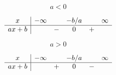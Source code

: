 \begin{minipage}{0.485\textwidth}
    \begin{center}
        \begin{equation*}
            a<0
        \end{equation*}
                  

               \begin{equation*}
                   \begin{array}[]{c|ccccc}
                        x&-\infty&&-b/a&&\infty\\
                         \hline
                         ax+b&&-&0&+&\\ 
                          \end{array}
                      \end{equation*}
    \end{center}
\end{minipage}
\hspace{1mm}
\begin{minipage}{0.485\textwidth}
    \begin{center}
        \begin{equation*}
            a>0
        \end{equation*}
                    

               \begin{equation*}
                   \begin{array}[]{c|ccccc}
                        x&-\infty&&-b/a&&\infty\\
                         \hline
                         ax+b&&+&0&-&\\ 
                          \end{array}
                      \end{equation*}
    \end{center}
\end{minipage}


